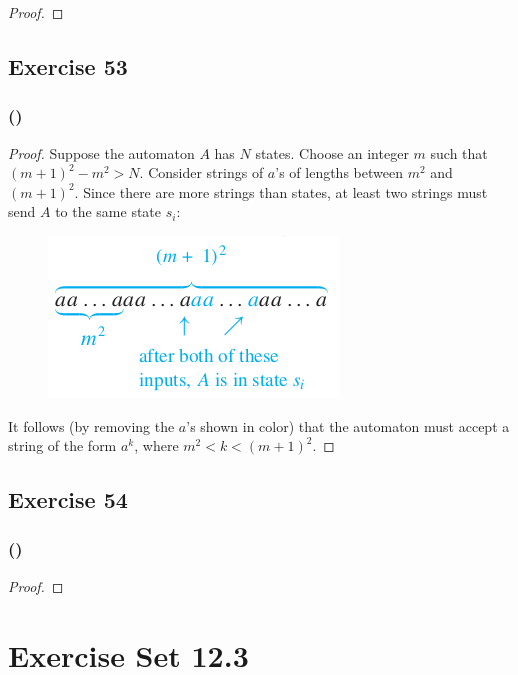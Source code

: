 \documentclass[14pt]{extarticle}
\begin{document}
\begin{proof}

\end{proof}

\subsection{Exercise 53}

\subsubsection{()}

\begin{proof}
Suppose the automaton \(A\) has \(N\) states. Choose an integer \(m\) such that \((m + 1)^2 - m^2 > N\). Consider 
strings of \(a\)’s of lengths between \(m^2\) and \((m + 1)^2\). Since there are more strings than states, at least two 
strings must send \(A\) to the same state \(s_i\):

\begin{figure}[ht!]
\centering
\includegraphics[scale=0.5]{../images/12.2.53.png}
\end{figure}

It follows (by removing the \(a\)’s shown in color) that the automaton must accept a string of the form \(a^k\), where 
\(m^2 < k < (m + 1)^2\).
\end{proof}

\subsection{Exercise 54}

\subsubsection{()}

\begin{proof}

\end{proof}

\section{Exercise Set 12.3}
\end{document}
